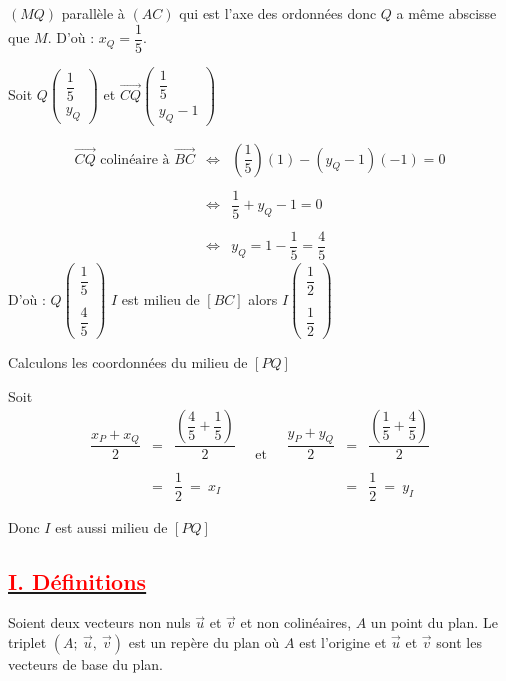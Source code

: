 \documentclass[12pt]{article}
\begin{document}
$(MQ)$ parallèle à $(AC)$ qui est l'axe des ordonnées donc $Q$ a même abscisse que $M.$ D'où : $x_{Q}=\dfrac{1}{5}.$

Soit $Q\begin{pmatrix}\dfrac{1}{5} \\ y_{Q}\end{pmatrix}$ et $\overrightarrow{CQ}\begin{pmatrix}\dfrac{1}{5} \\ y_{Q}-1\end{pmatrix}$

\begin{eqnarray}\overrightarrow{CQ}\text{ colinéaire à }\overrightarrow{BC}&\Leftrightarrow&\left(\dfrac{1}{5}\right)(1)-(y_{Q}-1)(-1)=0\nonumber\\ \\ &\Leftrightarrow&\dfrac{1}{5}+y_{Q}-1=0\nonumber\\ \\ &\Leftrightarrow&y_{Q}=1-\dfrac{1}{5}=\dfrac{4}{5}\nonumber \end{eqnarray}
D'où  : $Q\begin{pmatrix}\dfrac{1}{5} \\ \\ \dfrac{4}{5}\end{pmatrix}$
$I$ est milieu de $[BC]$ alors $I\begin{pmatrix}\dfrac{1}{2} \\ \\ \dfrac{1}{2}\end{pmatrix}$

Calculons les coordonnées du milieu de $[PQ]$

Soit $$\begin{array}{ccc}\dfrac{x_{P}+x_{Q}}{2}&=&\dfrac{\left(\dfrac{4}{5}+\dfrac{1}{5}\right)}{2} \\ \\ &=&\dfrac{1}{2}\ =\ x_{I} \end{array}\quad\text{et}\quad\begin{array}{ccc}\dfrac{y_{P}+y_{Q}}{2}&=&\dfrac{\left(\dfrac{1}{5}+\dfrac{4}{5}\right)}{2} \\ \\ &=&\dfrac{1}{2}\ =\ y_{I} \end{array}$$

Donc $I$ est aussi milieu de $[PQ]$
\subsection*{\underline{\textcolor{red}{\textbf{I. Définitions}}}}
Soient deux vecteurs non nuls $\vec{u}$ et $\vec{v}$ et non colinéaires, $A$ un point du plan. Le triplet $(A;\ \vec{u},\ \vec{v})$ est un repère du plan où $A$ est l'origine et $\vec{u}$ et $\vec{v}$ sont les vecteurs de base du plan.
\end{document}
